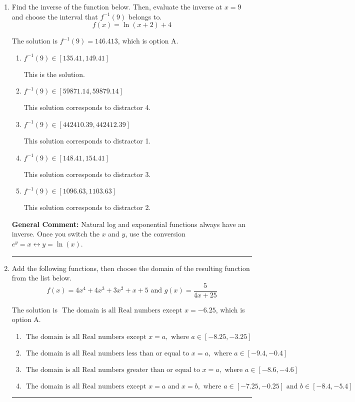 \documentclass{extbook}[14pt]
\newcommand{\litem}[1]{\item #1

\rule{\textwidth}{0.4pt}}
\begin{document}
\begin{enumerate}\litem{
Find the inverse of the function below. Then, evaluate the inverse at $x = 9$ and choose the interval that $f^{-1}(9)$ belongs to.
\[ f(x) = \ln{(x+2)}+4 \]

The solution is \( f^{-1}(9) = 146.413 \), which is option A.\begin{enumerate}[label=\Alph*.]
\item \( f^{-1}(9) \in [135.41, 149.41] \)

 This is the solution.
\item \( f^{-1}(9) \in [59871.14, 59879.14] \)

 This solution corresponds to distractor 4.
\item \( f^{-1}(9) \in [442410.39, 442412.39] \)

 This solution corresponds to distractor 1.
\item \( f^{-1}(9) \in [148.41, 154.41] \)

 This solution corresponds to distractor 3.
\item \( f^{-1}(9) \in [1096.63, 1103.63] \)

 This solution corresponds to distractor 2.
\end{enumerate}

\textbf{General Comment:} Natural log and exponential functions always have an inverse. Once you switch the $x$ and $y$, use the conversion $ e^y = x \leftrightarrow y=\ln(x)$.
}
\litem{
Add the following functions, then choose the domain of the resulting function from the list below.
\[ f(x) = 4x^{4} +4 x^{3} +3 x^{2} +x + 5 \text{ and } g(x) = \frac{5}{4x+25} \]

The solution is \( \text{ The domain is all Real numbers except } x = -6.25 \), which is option A.\begin{enumerate}[label=\Alph*.]
\item \( \text{ The domain is all Real numbers except } x = a, \text{ where } a \in [-8.25, -3.25] \)


\item \( \text{ The domain is all Real numbers less than or equal to } x = a, \text{ where } a \in [-9.4, -0.4] \)


\item \( \text{ The domain is all Real numbers greater than or equal to } x = a, \text{ where } a \in [-8.6, -4.6] \)


\item \( \text{ The domain is all Real numbers except } x = a \text{ and } x = b, \text{ where } a \in [-7.25, -0.25] \text{ and } b \in [-8.4, -5.4] \)



\end{enumerate}}
\end{enumerate}
\end{document}
